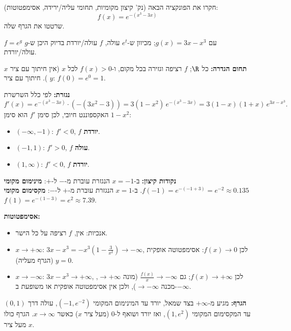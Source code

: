 
\begin{question}
חקרו את הפונקציה הבאה (נק' קיצון מקומיות, תחומי עליה/ירידה, אסימפטוטות):
\[ f(x)=e^{-(x^3-3x)} \]
שרטטו את הגרף שלה.
\end{question}

\begin{hint}
$f=e^{g}$ עם $g(x)=3x-x^3$; מכיוון ש-$e^t$ עולה, $f$ עולה/יורדת בדיוק היכן ש-$g$ עולה/יורדת.
\end{hint}

\begin{solution}
\textbf{תחום הגדרה:} כל $\R$; $f$ רציפה וגזירה בכל מקום, ו-$f(x)>0$ לכל $x$ (אין חיתוך עם ציר $x$). חיתוך עם ציר $y$: $f(0)=e^0=1$.

\textbf{נגזרת:} לפי כלל השרשרת
\[ f'(x)=e^{-(x^3-3x)}\cdot(-(3x^2-3))=3(1-x^2)\,e^{-(x^3-3x)}=3(1-x)(1+x)\,e^{3x-x^3}. \]
האקספוננט חיובי, לכן סימן $f'$ הוא סימן $1-x^2$:
\begin{itemize}
  \item $(-\infty,-1)$: $f'<0$, $f$ \textbf{יורדת}.
  \item $(-1,1)$: $f'>0$, $f$ \textbf{עולה}.
  \item $(1,\infty)$: $f'<0$, $f$ \textbf{יורדת}.
\end{itemize}

\textbf{נקודות קיצון:} ב-$x=-1$ הנגזרת עוברת מ-$-$ ל-$+$: \textbf{מינימום מקומי} $f(-1)=e^{-(-1+3)}=e^{-2}\approx0.135$. ב-$x=1$ הנגזרת עוברת מ-$+$ ל-$-$: \textbf{מקסימום מקומי} $f(1)=e^{-(1-3)}=e^{2}\approx7.39$.

\textbf{אסימפטוטות:}
\begin{itemize}
  \item אנכיות: אין, $f$ רציפה על כל הישר.
  \item $x\to+\infty$: $3x-x^3=-x^3\left(1-\frac{3}{x^2}\right)\to-\infty$, לכן $f(x)\to0$: אסימפטוטה אופקית $y=0$ (הגרף מעליה).
  \item $x\to-\infty$: $3x-x^3\to+\infty$, לכן $f(x)\to+\infty$; גם $\frac{f(x)}{x}\to-\infty$ (מונה $\to+\infty$, מכנה $\to-\infty$), ולכן אין אסימפטוטה אופקית או משופעת ב-$-\infty$.
\end{itemize}

\textbf{הגרף:} מגיע מ-$+\infty$ בצד שמאל, יורד עד המינימום המקומי $(-1,e^{-2})$, עולה דרך $(0,1)$ עד המקסימום המקומי $(1,e^2)$, ואז יורד ושואף ל-$0$ (מעל ציר $x$) כאשר $x\to\infty$. הגרף כולו מעל ציר $x$.
\end{solution}
